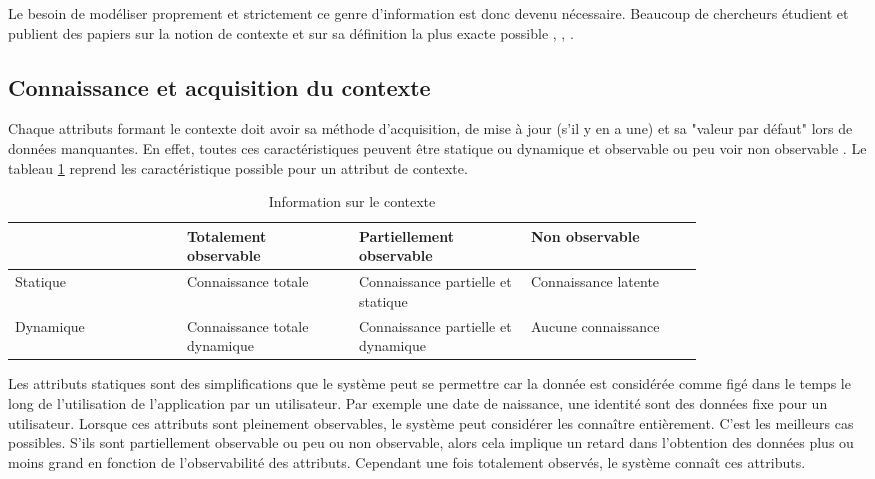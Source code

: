\documentclass[conference]{./sty/IEEEtran}
\begin{document}
Le besoin de modéliser proprement et strictement ce genre d'information est
donc devenu nécessaire. Beaucoup de chercheurs étudient et publient des papiers
sur la notion de contexte et sur sa définition la plus exacte possible
\cite{DBLP:journals/tlt/VerbertMOWDBD12},
\cite{DBLP:reference/rsh/AdomaviciusT11},
\cite{DBLP:journals/aim/AdomaviciusMRT11}. \\

\subsection{Connaissance et acquisition du contexte}

Chaque attributs formant le contexte doit avoir sa méthode d'acquisition, de
mise à jour (s'il y en a une) et sa "valeur par défaut" lors de données
manquantes. En effet, toutes ces caractéristiques peuvent être statique ou
dynamique et observable ou peu voir non observable
\cite{DBLP:journals/aim/AdomaviciusMRT11}. Le tableau
\ref{tab:update_observability_context} reprend les caractéristique possible
pour un attribut de contexte. \\

\begin{table}
  \caption{\label{tab:update_observability_context} Information sur le contexte \cite{DBLP:journals/aim/AdomaviciusMRT11}}
  \begin{tabular}{|p{0.20\linewidth}|p{0.20\linewidth}|p{0.20\linewidth}|p{0.20\linewidth}|}
    \hline
    ~ & Totalement observable & Partiellement observable & Non observable \\ \hline
    Statique & Connaissance totale & Connaissance partielle et statique & Connaissance latente \\ \hline
    Dynamique & Connaissance totale dynamique & Connaissance partielle et dynamique & Aucune connaissance \\ \hline
  \end{tabular}
\end{table}

Les attributs statiques sont des simplifications que le système peut se
permettre car la donnée est considérée comme figé dans le temps le long de
l'utilisation de l'application par un utilisateur. Par exemple une date de
naissance, une identité sont des données fixe pour un utilisateur. Lorsque ces
attributs sont pleinement observables, le système peut considérer les connaître
entièrement. C'est les meilleurs cas possibles. S'ils sont partiellement
observable ou peu ou non observable, alors cela implique un retard dans
l'obtention des données plus ou moins grand en fonction de l'observabilité des
attributs. Cependant une fois totalement observés, le système connaît ces
attributs. \\
\end{document}
